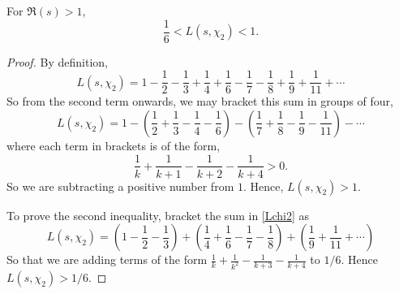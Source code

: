 \documentclass{unswmaths}
\begin{document}
    \begin{lemma}
        For $\Re(s) > 1$, 
        \begin{equation*}
            \frac{1}{6} < L(s,\chi_2) < 1.
        \end{equation*}
    \end{lemma}
    \begin{proof}
        By definition,
        \begin{equation}
        \label{Lchi2}
            L(s,\chi_2) = 1-\frac{1}{2}-\frac{1}{3}+\frac{1}{4}+\frac{1}{6}-\frac{1}{7}-\frac{1}{8}+\frac{1}{9}+\frac{1}{11}+\cdots
        \end{equation}
        So from the second term onwards, we may bracket this sum in groups of four,
        \begin{equation*}
            L(s,\chi_2) = 1-\left(\frac{1}{2}+\frac{1}{3}-\frac{1}{4}-\frac{1}{6}\right)-\left(\frac{1}{7}+\frac{1}{8}-\frac{1}{9}-\frac{1}{11}\right)-\cdots
        \end{equation*}
        where each term in brackets is of the form,
        \begin{equation*}
            \frac{1}{k}+\frac{1}{k+1}-\frac{1}{k+2}-\frac{1}{k+4} > 0.
        \end{equation*}
        So we are subtracting a positive number from $1$. Hence, $L(s,\chi_2) > 1$. 
        
        To prove the second inequality, bracket the sum in \ref{Lchi2} as
        \begin{equation*}
            L(s,\chi_2) = \left(1-\frac{1}{2}-\frac{1}{3}\right)+\left(\frac{1}{4}+\frac{1}{6}-\frac{1}{7}-\frac{1}{8}\right)+\left(\frac{1}{9}+\frac{1}{11}+\cdots\right)
        \end{equation*}
        So that we are adding terms of the form $\frac{1}{k}+\frac{1}{k^2}-\frac{1}{k+3}-\frac{1}{k+4}$ to $1/6$. Hence $L(s,\chi_2) > 1/6$.
    \end{proof}
    
    
\end{document}
